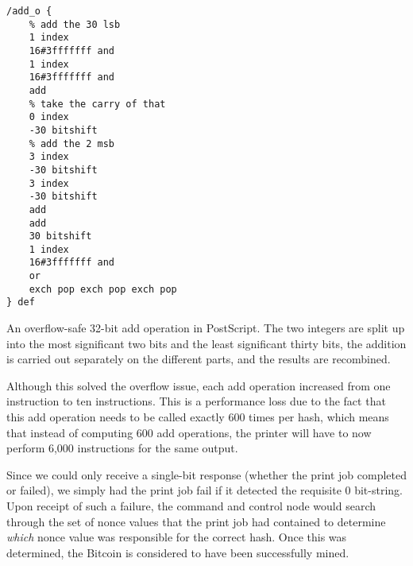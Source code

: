 \begin{table}
\label{overflow_add}
\begin{verbatim}
/add_o {
	% add the 30 lsb
	1 index
	16#3fffffff and
	1 index
	16#3fffffff and
	add
	% take the carry of that
	0 index
	-30 bitshift
	% add the 2 msb
	3 index
	-30 bitshift
	3 index
	-30 bitshift
	add
	add
	30 bitshift
	1 index
	16#3fffffff and
	or
	exch pop exch pop exch pop
} def
\end{verbatim}
\caption{An overflow-safe 32-bit add operation in PostScript. The two integers are split up into the most significant two bits and the least significant thirty bits, the addition is carried out separately on the different parts, and the results are recombined.}
\end{table}

Although this solved the overflow issue, each add operation increased from one instruction to ten instructions.
This is a performance loss due to the fact that this add operation needs to be called exactly 600 times per hash, which means that instead of computing 600 add operations, the printer will have to now perform 6,000 instructions for the same output.

Since we could only receive a single-bit response (whether the print job completed or failed), we simply had the print job fail if it detected the requisite 0 bit-string.
Upon receipt of such a failure, the command and control node would search through the set of nonce values that the print job had contained to determine \emph{which} nonce value was responsible for the correct hash.
Once this was determined, the Bitcoin is considered to have been successfully mined.

